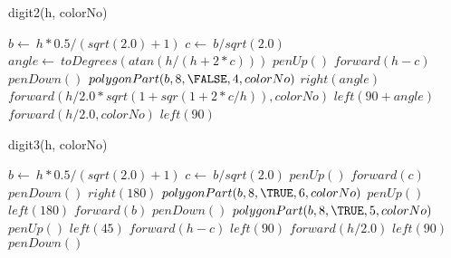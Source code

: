 \documentclass[a4paper,10pt]{article}
\begin{document}
\begin{algorithm}
\caption{digit2(h, colorNo)}
\begin{algorithmic}[5]

\STATE {}
\STATE {}
  \STATE \(b\gets\ h*0.5/(sqrt(2.0)+1)\)
  \STATE \(c\gets\ b/sqrt(2.0)\)
  \STATE \(angle\gets\ toDegrees(atan(h/(h+2*c)))\)
  \STATE \(penUp()\)
  \STATE \(forward(h-c)\)
  \STATE \(penDown()\)
  \STATE {}
  \STATE {}
  \STATE \(polygonPart(b,8,\FALSE,4,colorNo)\)
  \STATE \(right(angle)\)
  \STATE \(forward(h/2.0*sqrt(1+sqr(1+2*c/h)),colorNo)\)
  \STATE \(left(90+angle)\)
  \STATE \(forward(h/2.0,colorNo)\)
  \STATE \(left(90)\)

\end{algorithmic}
\end{algorithm}


\begin{algorithm}
\caption{digit3(h, colorNo)}
\begin{algorithmic}[5]

\STATE {}
\STATE {}
  \STATE \(b\gets\ h*0.5/(sqrt(2.0)+1)\)
  \STATE \(c\gets\ b/sqrt(2.0)\)
  \STATE \(penUp()\)
  \STATE \(forward(c)\)
  \STATE \(penDown()\)
  \STATE \(right(180)\)
  \STATE {}
  \STATE {}
  \STATE \(polygonPart(b,8,\TRUE,6,colorNo)\)
  \STATE \(penUp()\)
  \STATE \(left(180)\)
  \STATE \(forward(b)\)
  \STATE \(penDown()\)
  \STATE {}
  \STATE {}
  \STATE \(polygonPart(b,8,\TRUE,5,colorNo)\)
  \STATE \(penUp()\)
  \STATE \(left(45)\)
  \STATE \(forward(h-c)\)
  \STATE \(left(90)\)
  \STATE \(forward(h/2.0)\)
  \STATE \(left(90)\)
  \STATE \(penDown()\)

\end{algorithmic}
\end{algorithm}
\end{document}
